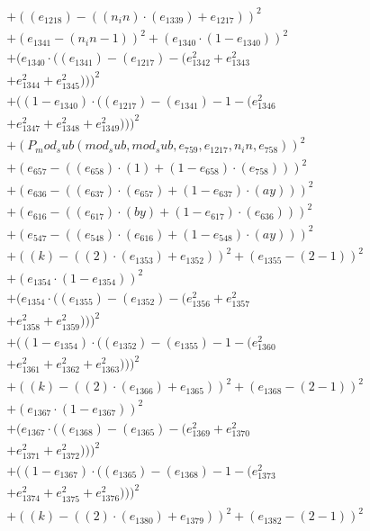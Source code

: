 \documentclass[10pt, a4paper]{article}
\begin{document}
\begin{align*}
& + ((e_{1218}) - ((n_in)  \cdot  (e_{1339}) + e_{1217}))^{2} \\
& + (e_{1341} - (n_in - 1))^{2} + (e_{1340}  \cdot  (1 - e_{1340}))^{2} \\
& + (e_{1340}  \cdot  ((e_{1341}) - (e_{1217}) - (e_{1342}^{2} + e_{1343}^{2} \\
& + e_{1344}^{2} + e_{1345}^{2})))^{2} \\
& + ((1 - e_{1340})  \cdot  ((e_{1217}) - (e_{1341}) - 1 - (e_{1346}^{2} \\
& + e_{1347}^{2} + e_{1348}^{2} + e_{1349}^{2})))^{2} \\
& + (P_mod_sub(mod_sub, mod_sub, e_{759}, e_{1217}, n_in, e_{758}))^{2} \\
& + (e_{657} - ((e_{658})  \cdot  (1) + (1 - e_{658})  \cdot  (e_{758})))^{2} \\
& + (e_{636} - ((e_{637})  \cdot  (e_{657}) + (1 - e_{637})  \cdot  (ay)))^{2} \\
& + (e_{616} - ((e_{617})  \cdot  (by) + (1 - e_{617})  \cdot  (e_{636})))^{2} \\
& + (e_{547} - ((e_{548})  \cdot  (e_{616}) + (1 - e_{548})  \cdot  (ay)))^{2} \\
& + ((k) - ((2)  \cdot  (e_{1353}) + e_{1352}))^{2} + (e_{1355} - (2 - 1))^{2} \\
& + (e_{1354}  \cdot  (1 - e_{1354}))^{2} \\
& + (e_{1354}  \cdot  ((e_{1355}) - (e_{1352}) - (e_{1356}^{2} + e_{1357}^{2} \\
& + e_{1358}^{2} + e_{1359}^{2})))^{2} \\
& + ((1 - e_{1354})  \cdot  ((e_{1352}) - (e_{1355}) - 1 - (e_{1360}^{2} \\
& + e_{1361}^{2} + e_{1362}^{2} + e_{1363}^{2})))^{2} \\
& + ((k) - ((2)  \cdot  (e_{1366}) + e_{1365}))^{2} + (e_{1368} - (2 - 1))^{2} \\
& + (e_{1367}  \cdot  (1 - e_{1367}))^{2} \\
& + (e_{1367}  \cdot  ((e_{1368}) - (e_{1365}) - (e_{1369}^{2} + e_{1370}^{2} \\
& + e_{1371}^{2} + e_{1372}^{2})))^{2} \\
& + ((1 - e_{1367})  \cdot  ((e_{1365}) - (e_{1368}) - 1 - (e_{1373}^{2} \\
& + e_{1374}^{2} + e_{1375}^{2} + e_{1376}^{2})))^{2} \\
& + ((k) - ((2)  \cdot  (e_{1380}) + e_{1379}))^{2} + (e_{1382} - (2 - 1))^{2} \\

\end{align*}
\end{document}
